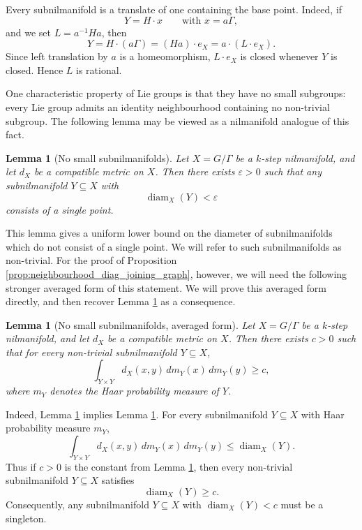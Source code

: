 \documentclass[12pt]{amsart}
\theoremstyle{plain}
\newtheorem{lemma}[theorem]{Lemma}
\theoremstyle{definition}
\newcommand\eps{\varepsilon}
\DeclareMathOperator{\diam}{diam}
\begin{document}
Every subnilmanifold is a translate of one containing the base point. Indeed, if
\[
Y = H \cdot x \qquad \text{with } x = a\Gamma,
\]
and we set $L = a^{-1}Ha$, then
\[
Y = H \cdot (a\Gamma) = (Ha)\cdot e_X = a \cdot (L \cdot e_X).
\]
Since left translation by $a$ is a homeomorphism, $L \cdot e_X$ is closed whenever $Y$ is closed. Hence $L$ is rational.

One characteristic property of Lie groups is that they have no small subgroups: every Lie group admits an identity neighbourhood containing no non-trivial subgroup. The following lemma may be viewed as a nilmanifold analogue of this fact. 

\begin{lemma}[No small subnilmanifolds] \label{lem:no_small_subnilmanifolds}
    Let $X = G/\Gamma$ be a $k$-step nilmanifold, and let $d_X$ be a compatible metric on $X$. Then there exists $\eps > 0$ such that any subnilmanifold $Y \subseteq X$ with
    \[
    \diam_X(Y) < \eps
    \]
    consists of a single point.
\end{lemma}

This lemma gives a uniform lower bound on the diameter of subnilmanifolds which do not consist of a single point.
We will refer to such subnilmanifolds as non-trivial. 
For the proof of Proposition \ref{prop:neighbourhood_diag_joining_graph}, however, we will need the following stronger averaged form of this statement. 
We will prove this averaged form directly, and then recover Lemma \ref{lem:no_small_subnilmanifolds} as a consequence. 

\begin{lemma}[No small subnilmanifolds, averaged form] \label{lem:no_small_subnilmanifolds_averaged}
    Let $X = G/\Gamma$ be a $k$-step nilmanifold, and let $d_X$ be a compatible metric on $X$. 
    Then there exists $c > 0$ such that for every non-trivial subnilmanifold $Y \subseteq X$, 
    \[
    \int_{Y \times Y} d_X(x,y) \,d m_Y(x) \,d m_Y(y) \geq c,
    \]
    where $m_Y$ denotes the Haar probability measure of $Y$.
\end{lemma}

Indeed, Lemma \ref{lem:no_small_subnilmanifolds_averaged} implies Lemma \ref{lem:no_small_subnilmanifolds}.
For every subnilmanifold $Y \subseteq X$ with Haar probability measure $m_Y$, 
\[
\int_{Y \times Y} d_X(x,y) \,d m_Y(x) \,d m_Y(y) \leq \diam_X(Y).
\]
Thus if $c > 0$ is the constant from Lemma \ref{lem:no_small_subnilmanifolds_averaged}, then every non-trivial subnilmanifold $Y \subseteq X$ satisfies
\[
\diam_X(Y) \geq c.
\]
Consequently, any subnilmanifold $Y \subseteq X$ with $\diam_X(Y) < c$ must be a singleton. 
\end{document}
